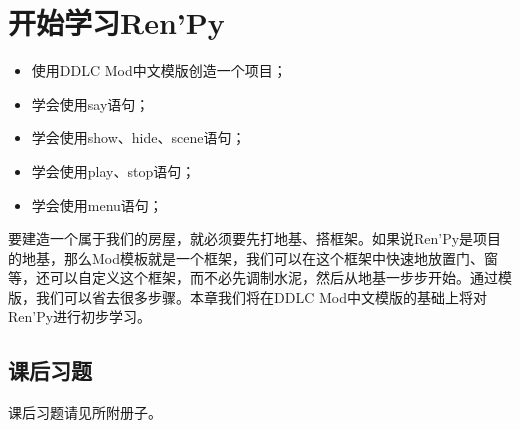 \documentclass[../../Main.tex]{subfiles}
\begin{document}
\chapter{开始学习Ren'Py}

\begin{ChapterGoals}
    \begin{itemize}
        \item \FZFangSong 使用DDLC Mod中文模版创造一个项目；
        \item \FZFangSong 学会使用say语句；
        \item \FZFangSong 学会使用show、hide、scene语句；
        \item \FZFangSong 学会使用play、stop语句；
        \item \FZFangSong 学会使用menu语句；
    \end{itemize}
\end{ChapterGoals}

要建造一个属于我们的房屋，就必须要先打地基、搭框架。如果说Ren'Py是项目的地基，那么Mod模板就是一个框架，我们可以在这个框架中快速地放置门、窗等，还可以自定义这个框架，而不必先调制水泥，然后从地基一步步开始。通过模版，我们可以省去很多步骤。本章我们将在DDLC Mod中文模版的基础上将对Ren'Py进行初步学习。



\section{课后习题}
课后习题请见所附册子。
\end{document}
